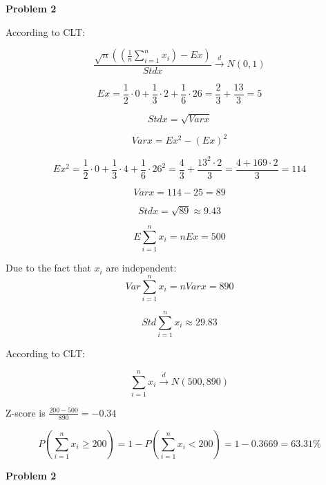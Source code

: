 \documentclass[12pt]{article}
\begin{document}
	\newpage
	
	\textbf{Problem 2}
	
	\bigskip

	According to CLT:
	
	$$ \frac{\sqrt{n} \left( \left( \frac{1}{n} \sum_{i = 1}^{n} x_i \right) - Ex \right)}{Stdx} \xrightarrow{d} N(0, 1) $$
		
	$$ Ex = \frac{1}{2} \cdot 0 + \frac{1}{3} \cdot 2 + \frac{1}{6} \cdot 26 = \frac{2}{3} + \frac{13}{3} = 5 $$
	
	$$ Std x = \sqrt{Var x}$$
	
	$$ Var x = Ex^2 - (Ex)^2 $$
	
	$$ Ex^2 = \frac{1}{2} \cdot 0 + \frac{1}{3} \cdot 4 + \frac{1}{6} \cdot 26^2 = \frac{4}{3} + \frac{13^2 \cdot 2}{3} = \frac{4 + 169 \cdot 2}{3} = 
	114 $$
	
	$$ Varx = 114 - 25 = 89 $$
	
	$$ Stdx = \sqrt{89} \approx 9.43 $$
	
	$$ E \sum_{i = 1}^{n} x_i = n Ex = 500 $$
	
	Due to the fact that $x_i$ are independent:
	$$ Var \sum_{i = 1}^{n} x_i = n Varx = 890 $$
	
	$$ Std \sum_{i = 1}^{n} x_i \approx 29.83 $$
	
	According to CLT:
	
	$$ \sum_{i = 1}^{n} x_i \xrightarrow{d} N(500, 890)$$
	
	Z-score is $\frac{200 - 500}{890} = - 0.34$
	
	$$ P \left( \sum_{i = 1}^{n} x_i  \geq 200 \right) = 1 - P \left( \sum_{i = 1}^{n} x_i  < 200 \right) = 1 - 0.3669 = 63.31 \% $$
	
	\newpage
	
	\textbf{Problem 2}
	
	\bigskip
\end{document}

